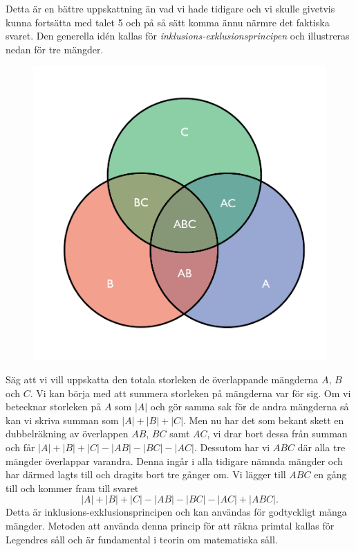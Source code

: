 Detta är en bättre uppskattning än vad vi hade tidigare och vi skulle givetvis kunna fortsätta med talet 5 och på så sätt komma ännu närmre det faktiska svaret.
Den generella idén kallas för \textit{inklusions-exklusionsprincipen} och illustreras nedan för tre mängder.
\begin{figure}[H]
    \centering
    \includegraphics[scale=0.3]{erik/Images/Venndiagram.pdf}
\end{figure}
Säg att vi vill uppskatta den totala storleken de överlappande mängderna $A$, $B$ och $C$. 
Vi kan börja med att summera storleken på mängderna var för sig.
Om vi betecknar storleken på $A$ som $|A|$ och gör samma sak för de andra mängderna så kan vi skriva summan som $|A|+|B|+|C|$.
Men nu har det som bekant skett en dubbelräkning av överlappen $AB$, $BC$ samt $AC$, vi drar bort dessa från summan och får $|A|+|B|+|C|-|AB|-|BC|-|AC|$.
Dessutom har vi $ABC$ där alla tre mängder överlappar varandra.
Denna ingår i alla tidigare nämnda mängder och har därmed lagts till och dragits bort tre gånger om. 
Vi lägger till $ABC$ en gång till och kommer fram till svaret
\begin{equation*}
    |A|+|B|+|C|-|AB|-|BC|-|AC|+|ABC|.
\end{equation*}
Detta är inklusions-exklusionsprincipen och kan användas för godtyckligt många mängder.
Metoden att använda denna princip för att räkna primtal kallas för Legendres såll och är fundamental i teorin om matematiska såll.


